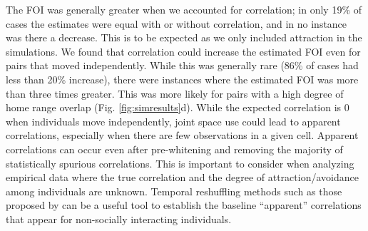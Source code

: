 \documentclass[letterpaper]{article}
\begin{document}
The FOI was generally greater when we accounted for correlation; in only 19\% of cases the estimates were equal with or without correlation, and in no instance was there a decrease. This is to be expected as we only included attraction in the simulations. 
We found that correlation could increase the estimated FOI even for pairs that moved independently. While this was generally rare (86\% of cases had less than 20\% increase), %
there were  instances where the estimated FOI was more than three times greater. This was more likely for pairs with a high degree of home range overlap (Fig. \ref{fig:simresults}d). 
While the expected correlation is 0 when individuals move independently, joint space use could lead to apparent correlations, especially when there are few observations in a given cell. Apparent correlations can occur even after pre-whitening and removing the majority of statistically spurious correlations. This is important to consider when analyzing empirical data where the true correlation and the degree of attraction/avoidance among individuals are unknown. Temporal reshuffling methods such as those proposed by \cite{Spiegel2016} can be a useful tool to establish the baseline ``apparent'' correlations that appear for non-socially interacting individuals.
\end{document}
